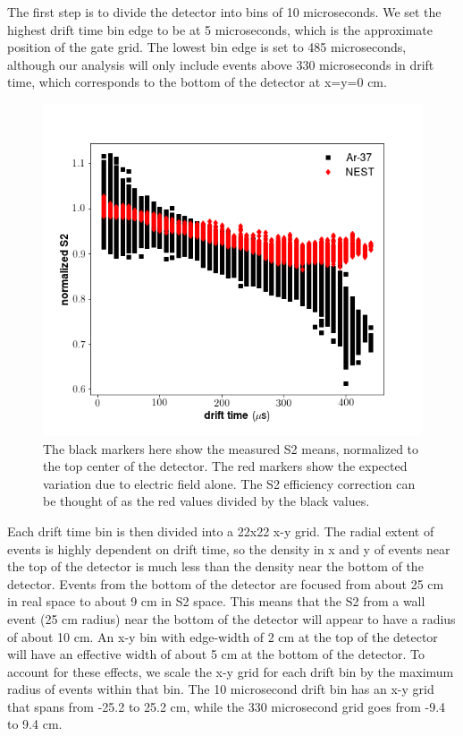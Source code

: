 The first step is to divide the detector into bins of 10 microseconds. We set the highest drift time bin edge to be at 5 microseconds, which is the approximate position of the gate grid. The lowest bin edge is set to 485 microseconds, although our analysis will only include events above 330 microseconds in drift time, which corresponds to the bottom of the detector at x=y=0 cm.
\begin{figure}[h!]
\centering
\includegraphics[width=150mm]{Figures/S2trend_dt.png}
\caption{The black markers here show the measured S2 means, normalized to the top center of the detector. The red markers show the expected variation due to electric field alone. The S2 efficiency correction can be thought of as the red values divided by the black values.}
\label{fig:S2trend_dt} 
\end{figure}

Each drift time bin is then divided into a 22x22 x-y grid. The radial extent of events is highly dependent on drift time, so the density in x and y of events near the top of the detector is much less than the density near the bottom of the detector. Events from the bottom of the detector are focused from about 25 cm in real space to about 9 cm in S2 space. This means that the S2 from a wall event (25 cm radius) near the bottom of the detector will appear to have a radius of about 10 cm. An x-y bin with edge-width of 2 cm at the top of the detector will have an effective width of about 5 cm at the bottom of the detector. To account for these effects, we scale the x-y grid for each drift bin by the maximum radius of events within that bin. The 10 microsecond drift bin has an x-y grid that spans from -25.2 to 25.2 cm, while the 330 microsecond grid goes from -9.4 to 9.4 cm.

